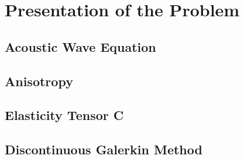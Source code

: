 \newpage
\section{Presentation of the Problem}

\subsection{Acoustic Wave Equation}

\subsection{Anisotropy}

\subsection{Elasticity Tensor C}

\subsection{Discontinuous Galerkin Method}
